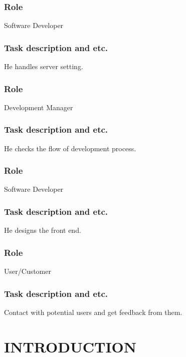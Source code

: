 \documentclass[letterpaper, 10 pt, conference]{ieeeconf}  %
\begin{document}
\subsubsection{Role} Software Developer
\subsubsection{Task description and etc.} He handles server setting.\\
\subsubsection{Role} Development Manager
\subsubsection{Task description and etc.} He checks the flow of development process.\\
\subsubsection{Role} Software Developer
\subsubsection{Task description and etc.} He designs the front end.\\
\subsubsection{Role} User/Customer
\subsubsection{Task description and etc.} Contact with potential users and get feedback from them.\\

\section{INTRODUCTION}
\end{document}
